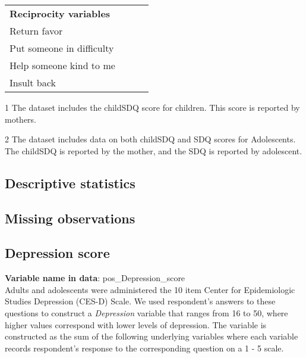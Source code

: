 \begin{table}[H]
\begin{center}
{\begin{threeparttable}
\begin{tabular}{L{5.5cm}C{2cm} C{2cm} C{2cm}}
		\textbf{Reciprocity variables}							&									&							&								\\
		\quad \quad Return favor								&									& \checkmark				& \checkmark					 \\
		\quad \quad Put someone in difficulty					&									& \checkmark				& \checkmark					 \\	
		\quad \quad Help someone kind to me					&									& \checkmark				& \checkmark					 \\
		\quad \quad Insult back								&									& \checkmark				& \checkmark					 \\

		
		\hline
		\end{tabular}

		\begin{tablenotes}
		\singlespace
		\footnotesize{
			\item [1] The dataset includes the childSDQ score for children. This score is reported by mothers. \\
			\item [2] The dataset includes data on both childSDQ and SDQ scores for Adolescents. The childSDQ is reported by the mother, and the SDQ is reported by adolescent.	
		}
		\end{tablenotes}
	\end{threeparttable}
	}
	\end{center}
\end{table}
\setcounter{footnote}{0}

 \clearpage

\begin{landscape}
\subsection{Descriptive statistics}

\end{landscape}

\begin{landscape}
\subsection{Missing observations}

\end{landscape}

\subsection{Depression score}
\textbf{Variable name in data}: pos\_Depression\_score \\[.3cm]
Adults and adolescents were administered the 10 item Center for Epidemiologic Studies Depression (CES-D) Scale. We used respondent's answers to these questions to construct a \textit{Depression} variable that ranges from 16 to 50, where higher values correspond with lower levels of depression. The variable is constructed as the sum of the following underlying variables where each variable records respondent's response to the corresponding question on a 1 - 5 scale. \\

